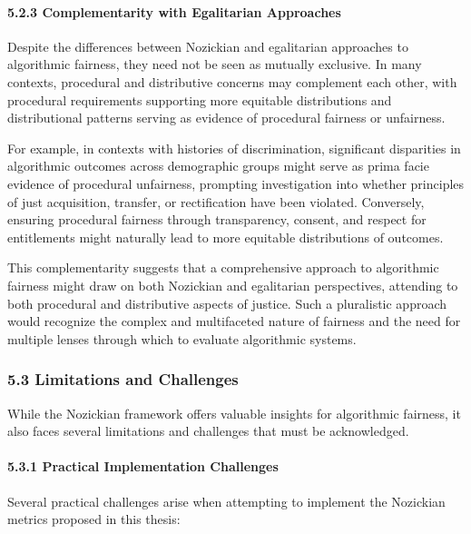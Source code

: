 \paragraph{5.2.3 Complementarity with Egalitarian
Approaches}\label{complementarity-with-egalitarian-approaches}

Despite the differences between Nozickian and egalitarian approaches to
algorithmic fairness, they need not be seen as mutually exclusive. In
many contexts, procedural and distributive concerns may complement each
other, with procedural requirements supporting more equitable
distributions and distributional patterns serving as evidence of
procedural fairness or unfairness.

For example, in contexts with histories of discrimination, significant
disparities in algorithmic outcomes across demographic groups might
serve as prima facie evidence of procedural unfairness, prompting
investigation into whether principles of just acquisition, transfer, or
rectification have been violated. Conversely, ensuring procedural
fairness through transparency, consent, and respect for entitlements
might naturally lead to more equitable distributions of outcomes.

This complementarity suggests that a comprehensive approach to
algorithmic fairness might draw on both Nozickian and egalitarian
perspectives, attending to both procedural and distributive aspects of
justice. Such a pluralistic approach would recognize the complex and
multifaceted nature of fairness and the need for multiple lenses through
which to evaluate algorithmic systems.

\subsubsection{5.3 Limitations and
Challenges}\label{limitations-and-challenges}

While the Nozickian framework offers valuable insights for algorithmic
fairness, it also faces several limitations and challenges that must be
acknowledged.

\paragraph{5.3.1 Practical Implementation
Challenges}\label{practical-implementation-challenges}

Several practical challenges arise when attempting to implement the
Nozickian metrics proposed in this thesis:

